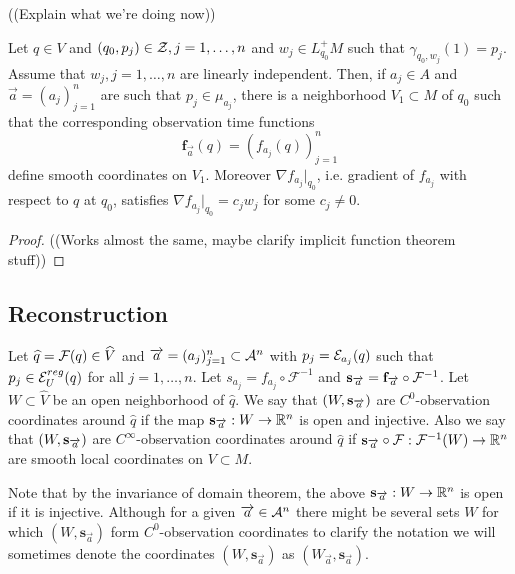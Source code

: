 ((Explain what we're doing now))

\begin{proposition}\label{prop:observationtimecoordinates}
Let $q\in V$ and $(q_0,p_j)\in \mc{Z}, j=1,\dots, n$ and $w_j\in L^+_{q_0}M$ such that $\gamma_{q_0,w_j}(1) = p_j$. Assume that $w_j, j=1,\dots, n$ are linearly independent. Then, if $a_j\in A$ and $\overrightarrow{a} = (a_j)^n_{j=1}$ are such that $p_j\in \mu_{a_j}$, there is a neighborhood $V_1\subset M$ of $q_0$ such that the corresponding observation time functions 
\[
\mathbf{f}_{\overrightarrow{a}}(q) = (f_{a_j}(q))^n_{j=1}
\]
define smooth coordinates on $V_1$. Moreover $\nabla f_{a_j}\rvert_{q_0}$, i.e. gradient of $f_{a_j}$ with respect to $q$ at $q_0$, satisfies $\nabla f_{a_j}\rvert_{q_0} = c_jw_j$ for some $c_j\neq 0$.
\end{proposition}
\begin{proof}
((Works almost the same, maybe clarify implicit function theorem stuff))
\end{proof}

\subsection{Reconstruction}

\begin{definition}
Let $\widehat{q}=\F(q)\in \widehat{V}$ and $\aa = (a_j)^n_{j=1}\subset \ca^n$ with $p_j = \mc{E}_{a_j}(q)$ such that $p_j\in \mc{E}_U^{reg}(q)$ for all $j=1,\dots,n$. Let $s_{a_j} = f_{a_j} \circ \mathcal{F}^{-1}$ and $\mathbf{s}_{\overrightarrow{a}}=\mathbf{f}_{\overrightarrow{a}}\circ\mc{F}^{-1}$. Let $W\subset\widehat{V}$ be an open neighborhood of $\widehat{q}$. We say that $(W,\mathbf{s}_\aa)$ are $C^0$-observation coordinates around $\widehat{q}$ if the map $\mathbf{s}_\aa:W\to \R^n$ is open and injective. Also we say that $(W,\mathbf{s}_\aa)$ are $C^\infty$-observation coordinates around $\widehat{q}$ if $\mathbf{s}_{\overrightarrow{a}}\circ\mc{F}:\mc{F}^{-1}(W)\to \R^n$ are smooth local coordinates on $V\subset M$.
\end{definition}
Note that by the invariance of domain theorem, the above $\mathbf{s}_{\overrightarrow{a}}:W\to \R^n$ is open if it is injective.
Although for a given $\overrightarrow{a}\in \ca^n$ there might be several sets $W$ for which $(W,\mathbf{s}_{\overrightarrow{a}})$ form $C^0$-observation coordinates to clarify the notation we will sometimes denote the coordinates $(W,\mathbf{s}_{\overrightarrow{a}})$ as $(W_{\overrightarrow{a}},\mathbf{s}_{\overrightarrow{a}})$. 

